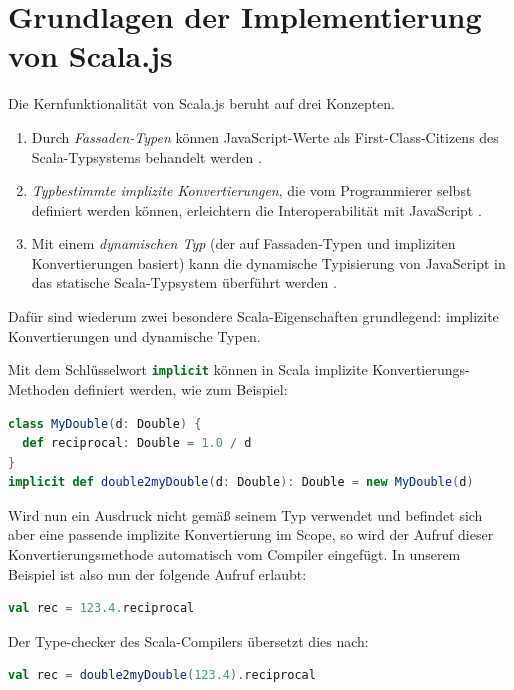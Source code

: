 \documentclass[a4paper, 12pt, hidelinks, listof=totoc, listoftables=totoc, bibliography=totoc]{scrreprt}
\newcommand{\scala}[1]{\lstinline[language=Scala, style=inline]|#1|}
\begin{document}
\section{Grundlagen der Implementierung von Scala.js}

Die Kernfunktionalität von Scala.js beruht auf drei Konzepten.
\begin{enumerate}
	\item Durch \textit{Fassaden-Typen} können JavaScript-Werte als First-Class-Citizens des Scala-Typsystems behandelt werden \cite[S. 4]{doeraene2013.TDI}.
	\item \textit{Typbestimmte implizite Konvertierungen}, die vom Programmierer selbst definiert werden können, erleichtern die Interoperabilität mit JavaScript \cite[S. 5]{doeraene2013.TDI}.
	\item Mit einem \textit{dynamischen Typ} (der auf Fassaden-Typen und impliziten Konvertierungen basiert) kann die dynamische Typisierung von JavaScript in das statische Scala-Typsystem überführt werden \cite[S. 6]{doeraene2013.TDI}.
\end{enumerate}

Dafür sind wiederum zwei besondere Scala-Eigenschaften grundlegend: implizite Konvertierungen und dynamische Typen.

Mit dem Schlüsselwort \scala{implicit} können in Scala implizite Konvertierungs-Methoden definiert werden, wie zum Beispiel:
\begin{lstlisting}[language=Scala, style=snippet]
class MyDouble(d: Double) {
  def reciprocal: Double = 1.0 / d
}
implicit def double2myDouble(d: Double): Double = new MyDouble(d)
\end{lstlisting}

Wird nun ein Ausdruck nicht gemäß seinem Typ verwendet und befindet sich aber eine passende implizite Konvertierung im Scope, so wird der Aufruf dieser Konvertierungsmethode automatisch vom Compiler eingefügt. In unserem Beispiel ist also nun der folgende Aufruf erlaubt:

\begin{lstlisting}[language=Scala, style=snippet]
val rec = 123.4.reciprocal
\end{lstlisting}

Der Type-checker des Scala-Compilers übersetzt dies nach:

\begin{lstlisting}[language=Scala, style=snippet]
val rec = double2myDouble(123.4).reciprocal
\end{lstlisting}
\end{document}
